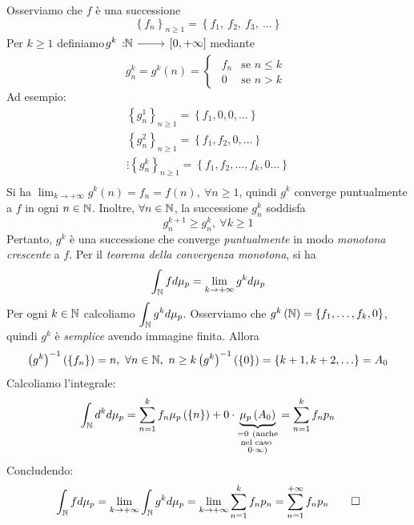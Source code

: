 \begin{demonstration}
	Osserviamo che $f$ è una successione
	\begin{equation*}
		\left\{f_n\right\}_{n\geq 1}=\left\{f_1,\ f_2,\ f_3,\ \ldots\right\}
	\end{equation*}
Per $k\geq 1$ definiamo $\funz{g^k}{\naturalset}{\left[0,+\infty\right]}$ mediante
\begin{equation*}
	g^k_n=g^k\left(n\right)=\begin{cases}
		\begin{array}{ll}
			f_n &\text{se }n\leq k\\
			0 &\text{se }n>k
		\end{array}
	\end{cases}
\end{equation*}
Ad esempio:
\begin{gather*}
	\left\{g^1_n\right\}_{n\geq 1}=\left\{f_1,0,0,\ldots\right\}\\
	\left\{g^2_n\right\}_{n\geq 1}=\left\{f_1,f_2,0,\ldots\right\}\\
	\vdots
	\left\{g^k_n\right\}_{n\geq 1}=\left\{f_1,f_2,\ldots,f_k,0\ldots\right\}\\
\end{gather*}
Si ha $\displaystyle\lim_{k\to+\infty}g^k\left(n\right)=f_n=f\left(n\right),\ \forall n\geq 1$, quindi $g^k$ converge puntualmente a $f$ in ogni $n\in\mathbb{N}$. Inoltre, $\forall n\in\mathbb{N}$, la successione $g^k_n$ soddisfa
\begin{equation*}
	g^{k+1}_n\geq g^k_n,\ \forall k\geq 1
\end{equation*}
Pertanto, $g^k$ è una successione che converge \textit{puntualmente} in modo \textit{monotona crescente} a $f$. Per il \textit{teorema della convergenza monotona}, si ha
\begin{equation*}
	\int_{\mathbb{N}}fd\mu_p=\lim_{k\to+\infty}g^kd\mu_p
\end{equation*}
Per ogni $k\in\mathbb{N}$ calcoliamo $\displaystyle\int_{\mathbb{N}}g^kd\mu_p$. Osserviamo che $g^k\left(\mathbb{N}\right)=\left\{f_1,\ldots,f_k,0\right\}$, quindi $g^k$ è \textit{semplice} avendo immagine finita. Allora
\begin{equation*}
	\left(g^k\right)^{-1}\left(\left\{f_n\right\}\right)=n,\ \forall n\in\naturalset,\ n\geq k\\
	\left(g^k\right)^{-1}\left(\left\{0\right\}\right)=\left\{k+1,k+2,\ldots\right\}=A_0
\end{equation*}
Calcoliamo l'integrale:
\begin{equation*}
	\int_{\mathbb{N}}d^kd\mu_p=\sum_{n=1}^{k}f_n\mu_p\left(\left\{n\right\}\right)+0\cdot \underbrace{\mu_p\left(A_0\right)}_{\substack{=0\ (\text{anche} \\ \text{nel caso } \\ 0\cdot \infty)}}=\sum_{n=1}^{k}f_np_n
\end{equation*}
Concludendo:
\begin{equation*}
	\int_{\mathbb{N}}fd\mu_p=\lim_{k\to+\infty}\int_{\mathbb{N}}g^kd\mu_p=\lim_{k\to+\infty}\sum_{n=1}^{k}f_np_n=\sum_{n=1}^{+\infty}f_np_n\qedhere
\end{equation*}
\end{demonstration}
